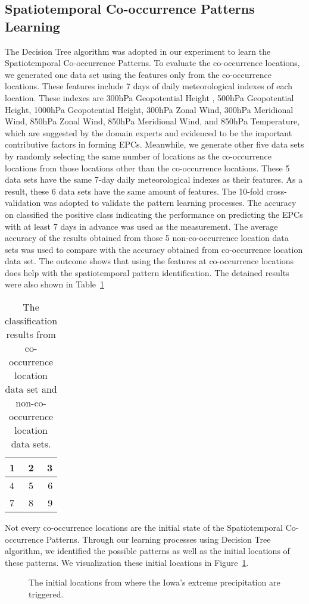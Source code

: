 \documentclass{acm_proc_article-sp}
\begin{document}
\subsection{Spatiotemporal Co-occurrence Patterns Learning}
The Decision Tree algorithm was adopted in our experiment to learn the Spatiotemporal Co-occurrence Patterns. To evaluate the co-occurrence locations, we generated one data set using the features only from the co-occurrence locations. These features include 7 days of daily meteorological indexes of each location. These indexes are 300hPa Geopotential Height
, 500hPa Geopotential Height, 1000hPa Geopotential Height, 300hPa Zonal Wind, 300hPa Meridional Wind, 850hPa Zonal Wind, 850hPa Meridional Wind, and 850hPa Temperature, which are suggested by the domain experts and evidenced to be the important contributive factors in forming EPCs. Meanwhile, we generate other five data sets by randomly selecting the same number of locations as the co-occurrence locations from those locations other than the co-occurrence locations. These 5 data sets have the same 7-day daily meteorological indexes as their features. As a result, these 6 data sets have the same amount of features. 
\newline
The 10-fold cross-validation was adopted to validate the pattern learning processes. The accuracy on classified the positive class indicating the performance on predicting the EPCs with at least 7 days in advance was used as the measurement. The average accuracy of the results obtained from those 5 non-co-occurrence location data sets was used to compare with the accuracy obtained from co-occurrence location data set. The outcome shows that using the features at co-occurrence locations does help with the spatiotemporal pattern identification. The detained results were also shown in Table~\ref{tab:random}
\begin{table}
\centering
\caption{The classification results from co-occurrence location data set and non-co-occurrence location data sets.}
\begin{tabular}{| l | c | r |}
    \hline
    1 & 2 & 3 \\ \hline
    4 & 5 & 6 \\ \hline
    7 & 8 & 9 \\
    \hline
\end{tabular}
\label{tab:random}
\end{table}
\newline
Not every co-occurrence locations are the initial state of the Spatiotemporal Co-occurrence Patterns. Through our learning processes using Decision Tree algorithm, we identified the possible patterns as well as the initial locations of these patterns. We visualization these initial locations in Figure~\ref{fig:inilocations}.
\begin{figure}  
\begin{center}  
\caption{The initial locations from where the Iowa's extreme precipitation are triggered.  \label{fig:inilocations}}  
\end{center}  
\end{figure}
    
\end{document}
